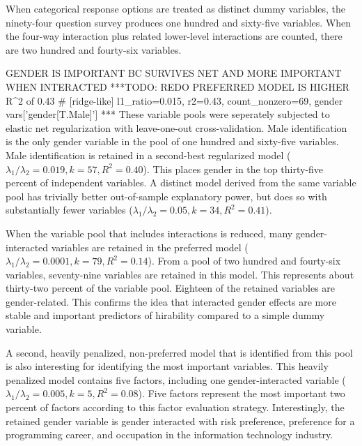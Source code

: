 \documentclass[review]{elsarticle}
\begin{document}
When categorical response options are treated as distinct dummy variables,
the ninety-four question survey produces one hundred and sixty-five variables.
When the four-way interaction plus related lower-level interactions are counted,
there are two hundred and fourty-six variables.

GENDER IS IMPORTANT BC SURVIVES NET AND MORE IMPORTANT WHEN INTERACTED
***TODO: REDO PREFERRED MODEL IS HIGHER R^2 of 0.43
# [ridge-like] l1_ratio=0.015, r2=0.43, count_nonzero=69, gender vars['gender[T.Male]']
***
These variable pools were seperately subjected to elastic net regularization with leave-one-out cross-validation.
Male identification is the only gender variable in the pool of one hundred and sixty-five variables.
Male identification is retained in a second-best regularized model ($ \lambda_1 / \lambda_2 = 0.019, k = 57, R^2=0.40 $).
This places gender in the top thirty-five percent of independent variables.
A distinct model derived from the same variable pool has trivially better out-of-sample explanatory power,
but does so with substantially fewer variables ($ \lambda_1 / \lambda_2 = 0.05, k = 34, R^2=0.41 $).

When the variable pool that includes interactions is reduced, many gender-interacted variables
are retained in the preferred model ($ \lambda_1 / \lambda_2 = 0.0001, k = 79, R^2=0.14 $).
From a pool of two hundred and fourty-six variables, seventy-nine variables are retained in this model.
This represents about thirty-two percent of the variable pool.
Eighteen of the retained variables are gender-related.
This confirms the idea that interacted gender effects are more stable and important predictors of hirability
compared to a simple dummy variable.

A second, heavily penalized, non-preferred model that is identified from this pool is also interesting for identifying the most important variables.
This heavily penalized model contains five factors,
including one gender-interacted variable ($ \lambda_1 / \lambda_2 = 0.005, k = 5, R^2=0.08 $).
Five factors represent the most important two percent of factors according to this factor evaluation strategy.
Interestingly, the retained gender variable is gender interacted with risk preference, preference for a programming career,
and occupation in the information technology industry.
\end{document}
